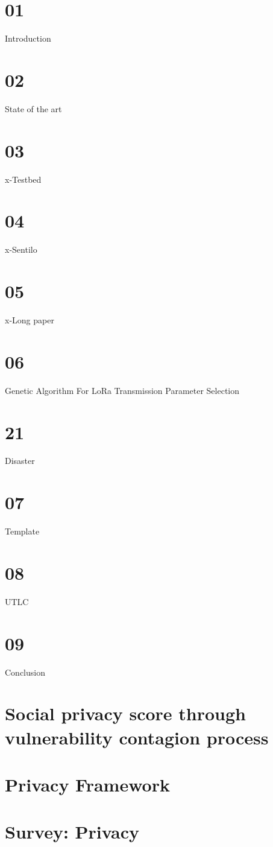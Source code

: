 

\def\printbib{\printbibliography}%



\firstpage
\chapter{01}{Introduction}
\chapter{02}{State of the art}
\chapter{03}{x-Testbed}
\chapter{04}{x-Sentilo}
\chapter{05}{x-Long paper}
\chapter{06}{Genetic Algorithm For LoRa Transmission Parameter Selection}
\chapter{21}{Disaster}
\chapter{07}{Template}
\chapter{08}{UTLC}
\chapter{09}{Conclusion}
\chapter[10]{Social privacy score through vulnerability contagion process}
\chapter[11]{Privacy Framework}
\chapter[12]{Survey: Privacy}
	
\frameBibliography



